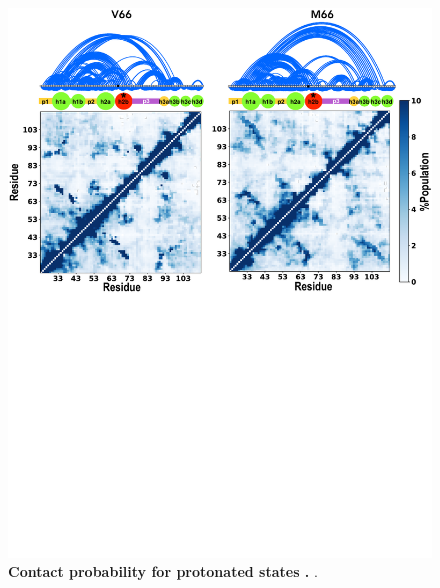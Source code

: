 \documentclass[journal=jacsat,manuscript=article]{achemso}
\begin{document}
\begin{figure}[!ht]
 \includegraphics[scale=0.5,width=\textwidth,trim={0 0cm 0 0},clip]{../figures/S5.pdf}
\caption{{\bf Contact probability for protonated states .}
.
 }
\label{S5} 
\end{figure}
\end{document}
